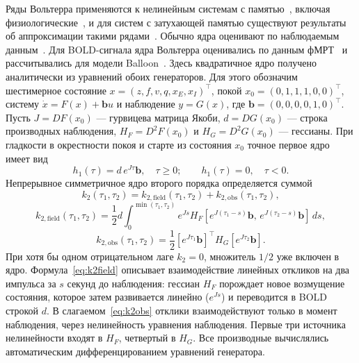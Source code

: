 Ряды Вольтерра применяются к нелинейным системам с памятью~\cite{volterra1930,schetzen1980}, включая физиологические~\cite{marmarelis2004,hunter1986}, и для систем с затухающей памятью существуют результаты об аппроксимации такими рядами~\cite{boyd1985}. Обычно ядра оценивают по наблюдаемым данным~\cite{pintelon2012,schoukens2015}. Для BOLD-сигнала ядра Вольтерра оценивались по данным фМРТ~\cite{friston1998} и рассчитывались для модели Balloon~\cite{friston2000}. Здесь квадратичное ядро получено аналитически из уравнений обоих генераторов. Для этого обозначим шестимерное состояние $x=(z,f,v,q,x_E,x_I)^\top$, покой $x_0=(0,1,1,1,0,0)^\top$, систему $\dot x=F(x)+\mathbf b u$ и наблюдение $y=G(x)$, где $\mathbf b=(0,0,0,0,1,0)^\top$. Пусть $J=DF(x_0)$ --- гурвицева матрица Якоби, $d=DG(x_0)$ --- строка производных наблюдения, $H_F=D^2F(x_0)$ и $H_G=D^2G(x_0)$ --- гессианы. При гладкости в окрестности покоя и старте из состояния $x_0$ точное первое ядро имеет вид
\begin{equation}\label{eq:h1}
h_1(\tau)=d\,e^{J\tau}\mathbf b,\quad \tau\ge0;\qquad h_1(\tau)=0,\quad\tau<0.
\end{equation}
Непрерывное симметричное ядро второго порядка определяется суммой
\begin{equation}\label{eq:k2}
k_2(\tau_1,\tau_2)=k_{2,\mathrm{field}}(\tau_1,\tau_2)+k_{2,\mathrm{obs}}(\tau_1,\tau_2),
\end{equation}
\begin{equation}\label{eq:k2field}
k_{2,\mathrm{field}}(\tau_1,\tau_2)=\frac12 d\int_0^{\min(\tau_1,\tau_2)}e^{Js}H_F[e^{J(\tau_1-s)}\mathbf b,\,e^{J(\tau_2-s)}\mathbf b]\,ds,
\end{equation}
\begin{equation}\label{eq:k2obs}
k_{2,\mathrm{obs}}(\tau_1,\tau_2)=\frac12[e^{J\tau_1}\mathbf b]^\top H_G[e^{J\tau_2}\mathbf b].
\end{equation}
При хотя бы одном отрицательном лаге $k_2=0$, множитель $1/2$ уже включен в ядро. Формула~\eqref{eq:k2field} описывает взаимодействие линейных откликов на два импульса за $s$ секунд до наблюдения: гессиан $H_F$ порождает новое возмущение состояния, которое затем развивается линейно ($e^{Js}$) и переводится в BOLD строкой $d$. В слагаемом~\eqref{eq:k2obs} отклики взаимодействуют только в момент наблюдения, через нелинейность уравнения наблюдения. Первые три источника нелинейности входят в $H_F$, четвертый в $H_G$. Все производные вычислялись автоматическим дифференцированием уравнений генератора.

